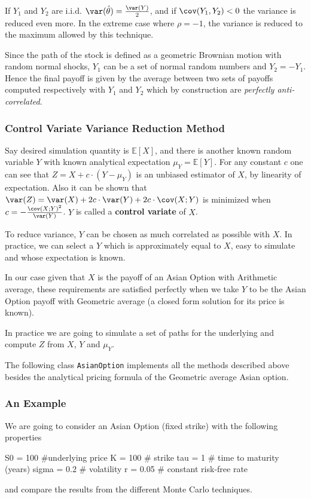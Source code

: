 If $Y_1$ and $Y_2$ are i.i.d. $\var(\hat{\theta})=\frac{\var(Y)}{2}$, and if $\cov(Y_1, Y_2)<0$ the variance is reduced even more. In the extreme case where $\rho=-1$, the variance is reduced to the maximum allowed by this technique. 

Since the path of the stock is defined as a geometric Brownian motion with random normal shocks, $Y_1$ can be a set of normal random numbers and $Y_2 = -Y_1$. Hence the final payoff is given by the average between two sets of payoffs computed respectively with $Y_1$ and $Y_2$ which by construction are \emph{perfectly anti-correlated}. 

\subsubsection{Control Variate Variance Reduction Method}

Say desired simulation quantity is $\mathbb{E}[X]$, and there is another known random variable $Y$ with known analytical expectation $\mu_Y = \mathbb{E}[Y]$. For any constant $c$ one can see that $Z = X + c\cdot(Y -\mu_Y)$ is an unbiased estimator of $X$, by linearity of expectation. Also it can be shown that $\var(Z) = \var(X) + 2c\cdot \var(Y) + 2c\cdot\cov(X; Y)$ is minimized when $c = -\frac{\cov(X;Y)^2}{\var(Y)}$. 
$Y$ is called a \textbf{control variate} of $X$. 

To reduce variance, $Y$ can be chosen as much correlated as possible with $X$. In practice, we can select a $Y$ which is approximately equal to $X$, easy to simulate and whose expectation is known. 

In our case given that $X$ is the payoff of an Asian Option with Arithmetic average, these requirements are satisfied perfectly when we take $Y$ to be the Asian Option payoff with Geometric average (a closed form solution for its price is known).

In practice we are going to simulate a set of paths for the underlying and compute $Z$ from  $X$, $Y$ and $\mu_Y$.

\begin{finmarkets}
The following class \texttt{AsianOption} implements all the methods described above besides the analytical pricing formula of the Geometric average Asian option.
\end{finmarkets}


\subsubsection{An Example}
We are going to consider an Asian Option (fixed strike) with the following properties
\begin{ipythonnon}
S0 = 100 #underlying price
K = 100 # strike
tau = 1 # time to maturity (years)
sigma = 0.2 # volatility
r = 0.05 # constant risk-free rate
\end{ipythonnon}
and compare the results from the different Monte Carlo techniques.

